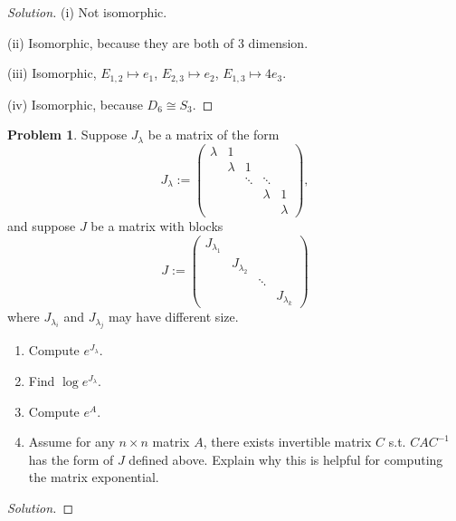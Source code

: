 \documentclass{article}
\theoremstyle{definition}
\newtheorem{problem}{Problem}
\theoremstyle{plain}
\begin{document}
\begin{adjustwidth}{0.7cm}{}
\color{blue}
\begin{proof}[Solution]
(i) Not isomorphic.\par
(ii) Isomorphic, because they are both of 3 dimension.\par
(iii) Isomorphic, $E_{1,2}\mapsto e_1$, $E_{2,3}\mapsto e_2$, $E_{1,3}\mapsto4e_3$.\par
(iv) Isomorphic, because $D_6\cong S_3$.
\color{black}
\end{proof}
\end{adjustwidth}

\begin{problem}
Suppose $J_\lambda$ be a matrix of the form
\begin{displaymath}
J_\lambda:=\begin{pmatrix}\lambda&1&&&\\ &\lambda&1&&\\ &&\ddots&\ddots&\\ &&&\lambda&1\\ &&&&\lambda\end{pmatrix},
\end{displaymath}
and suppose $J$ be a matrix with blocks
\begin{displaymath}
J:=\begin{pmatrix}J_{\lambda_1}&&&\\ &J_{\lambda_2}&&\\ &&\ddots&\\ &&&J_{\lambda_k}\end{pmatrix}
\end{displaymath}
where $J_{\lambda_i}$ and $J_{\lambda_j}$ may have different size.
\begin{enumerate}
\item Compute $e^{J_\lambda}$.
\item Find $\log e^{J_\lambda}$.
\item Compute $e^A$.
\item Assume for any $n\times n$ matrix $A$, there exists invertible matrix $C$ s.t. $CAC^{-1}$ has the form of $J$ defined above. Explain why this is helpful for computing the matrix exponential.
\end{enumerate}
\end{problem}
\begin{adjustwidth}{0.7cm}{}
\color{blue}
\begin{proof}[Solution]
\color{black}
\end{proof}
\end{adjustwidth}
\end{document}
